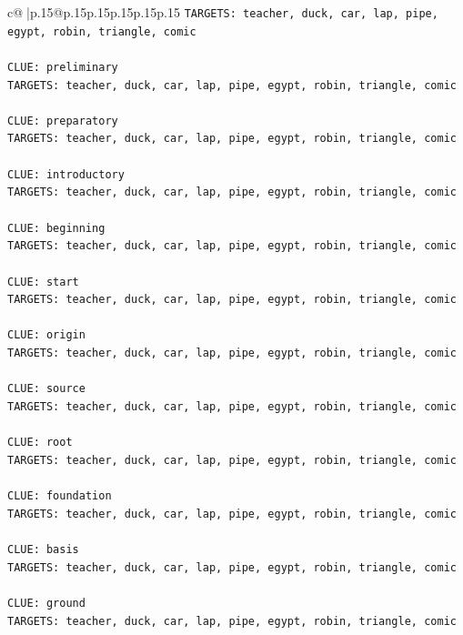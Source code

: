 \documentclass{article}
\begin{document}
{\begin{supertabular}{c@{$\;$}|p{.15\linewidth}@{}p{.15\linewidth}p{.15\linewidth}p{.15\linewidth}p{.15\linewidth}p{.15\linewidth}}
{{{\texttt{TARGETS: teacher, duck, car, lap, pipe, egypt, robin, triangle, comic} \\
\\ 
\texttt{CLUE: preliminary} \\
\texttt{TARGETS: teacher, duck, car, lap, pipe, egypt, robin, triangle, comic} \\
\\ 
\texttt{CLUE: preparatory} \\
\texttt{TARGETS: teacher, duck, car, lap, pipe, egypt, robin, triangle, comic} \\
\\ 
\texttt{CLUE: introductory} \\
\texttt{TARGETS: teacher, duck, car, lap, pipe, egypt, robin, triangle, comic} \\
\\ 
\texttt{CLUE: beginning} \\
\texttt{TARGETS: teacher, duck, car, lap, pipe, egypt, robin, triangle, comic} \\
\\ 
\texttt{CLUE: start} \\
\texttt{TARGETS: teacher, duck, car, lap, pipe, egypt, robin, triangle, comic} \\
\\ 
\texttt{CLUE: origin} \\
\texttt{TARGETS: teacher, duck, car, lap, pipe, egypt, robin, triangle, comic} \\
\\ 
\texttt{CLUE: source} \\
\texttt{TARGETS: teacher, duck, car, lap, pipe, egypt, robin, triangle, comic} \\
\\ 
\texttt{CLUE: root} \\
\texttt{TARGETS: teacher, duck, car, lap, pipe, egypt, robin, triangle, comic} \\
\\ 
\texttt{CLUE: foundation} \\
\texttt{TARGETS: teacher, duck, car, lap, pipe, egypt, robin, triangle, comic} \\
\\ 
\texttt{CLUE: basis} \\
\texttt{TARGETS: teacher, duck, car, lap, pipe, egypt, robin, triangle, comic} \\
\\ 
\texttt{CLUE: ground} \\
\texttt{TARGETS: teacher, duck, car, lap, pipe, egypt, robin, triangle, comic} \\
}}}
\end{supertabular}}
\end{document}
